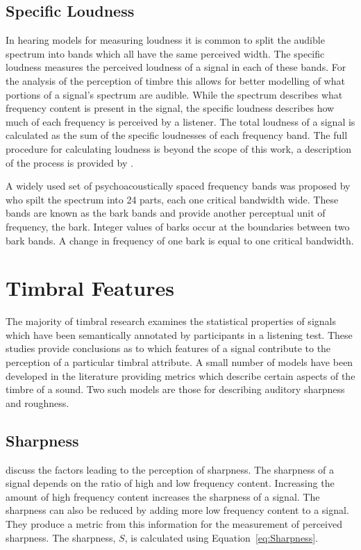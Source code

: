 	\subsection{Specific Loudness}
	\label{sec:Timbre-PsychoacousticPrinciples-SpecificLoudness}
		In hearing models for measuring loudness it is common to split the audible spectrum into bands which all
		have the same perceived width. The specific loudness measures the perceived loudness of a signal in each of
		these bands. For the analysis of the perception of timbre this allows for better modelling of what portions
		of a signal's spectrum are audible. While the spectrum describes what frequency content is present in the
		signal, the specific loudness describes how much of each frequency is perceived by a listener.  The total
		loudness of a signal is calculated as the sum of the specific loudnesses of each frequency band. The full
		procedure for calculating loudness is beyond the scope of this work, a description of the process is
		provided by \citet{moore1997a}. 

		A widely used set of psychoacoustically spaced frequency bands was proposed by
		\citet{zwicker1961subdivision} who spilt the spectrum into 24 parts, each one critical bandwidth wide.
		These bands are known as the bark bands and provide another perceptual unit of frequency, the bark. Integer
		values of barks occur at the boundaries between two bark bands. A change in frequency of one bark is equal
		to one critical bandwidth.

\section{Timbral Features}
\label{sec:Timbre-TimbralFeatures}
	The majority of timbral research examines the statistical properties of signals which have been semantically
	annotated by participants in a listening test. These studies provide conclusions as to which features of a signal
	contribute to the perception of a particular timbral attribute. A small number of models have been developed in the
	literature providing metrics which describe certain aspects of the timbre of a sound. Two such models are those for
	describing auditory sharpness and roughness.
	
	\subsection{Sharpness}
	\label{sec:Timbre-TimbralFeatures-Sharpness}
		\citet{fastl2007psychoacoustics} discuss the factors leading to the perception of sharpness. The sharpness
		of a signal depends on the ratio of high and low frequency content. Increasing the amount of high frequency
		content increases the sharpness of a signal. The sharpness can also be reduced by adding more low frequency
		content to a signal. They produce a metric from this information for the measurement of perceived
		sharpness. The sharpness, $S$, is calculated using Equation~\ref{eq:Sharpness}.

